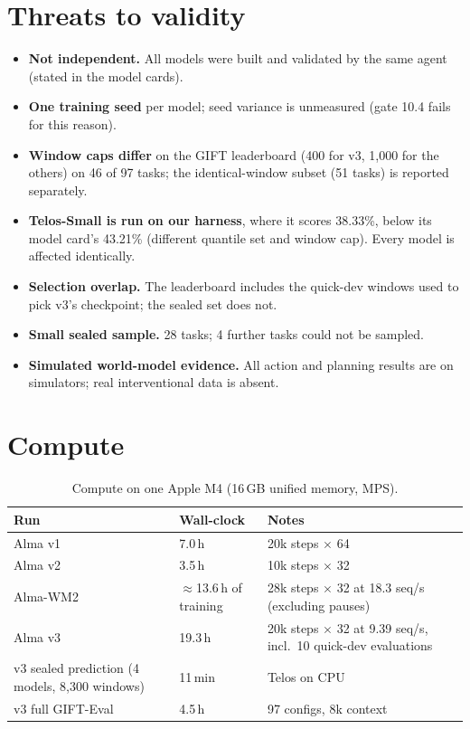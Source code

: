 \documentclass[10pt,a4paper]{extarticle}
\begin{document}
\section{Threats to validity}
\begin{itemize}
\item \textbf{Not independent.} All models were built and validated by the same agent (stated in the model cards).
\item \textbf{One training seed} per model; seed variance is unmeasured (gate 10.4 fails for this reason).
\item \textbf{Window caps differ} on the GIFT leaderboard (400 for v3, 1{,}000 for the others) on 46 of 97 tasks;
the identical-window subset (51 tasks) is reported separately.
\item \textbf{Telos-Small is run on our harness}, where it scores 38.33\%, below its model card's 43.21\% (different quantile set
and window cap). Every model is affected identically.
\item \textbf{Selection overlap.} The leaderboard includes the quick-dev windows used to pick v3's checkpoint; the sealed set does not.
\item \textbf{Small sealed sample.} 28 tasks; 4 further tasks could not be sampled.
\item \textbf{Simulated world-model evidence.} All action and planning results are on simulators; real interventional data is absent.
\end{itemize}

\section{Compute}
\begin{table}[H]
\centering\small
\caption{Compute on one Apple M4 (16\,GB unified memory, MPS).}
\begin{tabular}{@{}lll@{}}
\toprule
Run & Wall-clock & Notes \\
\midrule
Alma v1 & 7.0\,h & 20k steps $\times$ 64 \\
Alma v2 & 3.5\,h & 10k steps $\times$ 32 \\
Alma-WM2 & $\approx$13.6\,h of training & 28k steps $\times$ 32 at 18.3 seq/s (excluding pauses) \\
Alma v3 & 19.3\,h & 20k steps $\times$ 32 at 9.39 seq/s, incl.\ 10 quick-dev evaluations \\
v3 sealed prediction (4 models, 8{,}300 windows) & 11\,min & Telos on CPU \\
v3 full GIFT-Eval & 4.5\,h & 97 configs, 8k context \\
\bottomrule
\end{tabular}
\end{table}
\end{document}
